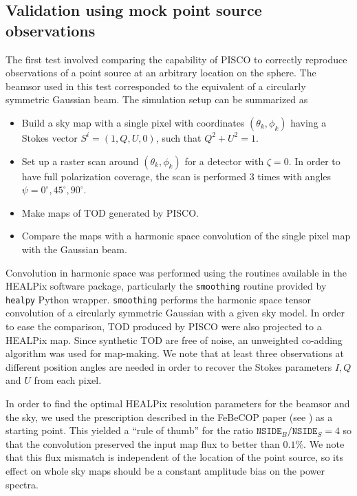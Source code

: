 \documentclass[a4paper,fleqn]{cas-dc}\sloppy
\begin{document}
\subsection{Validation using mock point source observations}

The first test involved comparing the capability of PISCO to correctly reproduce observations of a point source at an arbitrary location on the sphere. The beamsor used in this test corresponded to the equivalent of a circularly symmetric Gaussian beam. The simulation setup can be summarized as

\begin{itemize}
	\item Build a sky map with a single pixel with coordinates $(\theta_k,\phi_k)$ having a Stokes vector $S^{i} = (1,Q,U,0)$, such that $Q^2 + U^2 = 1$.
	\item Set up a raster scan around $(\theta_k,\phi_k)$ for a detector with $\zeta=0$. In order to have full polarization coverage, the scan is performed 3 times with angles $\psi = 0^{\circ},45^{\circ},90^{\circ}$.
	\item Make maps of TOD generated by PISCO.
	\item Compare the maps with a harmonic space convolution of the single pixel map with the Gaussian beam.
\end{itemize}

\noindent
Convolution in harmonic space was performed using the routines available in the HEALPix software package\cite{2005ApJ...622..759G}, particularly the \texttt{smoothing} routine provided by \texttt{healpy} Python wrapper. \texttt{smoothing} performs the harmonic space tensor convolution of a circularly symmetric Gaussian with a given sky model. In order to ease the comparison, TOD produced by PISCO were also projected to a HEALPix map. Since synthetic TOD are free of noise, an unweighted co-adding algorithm was used for map-making. We note that at least three observations at different position angles are needed in order to recover the Stokes parameters $I,Q$ and $U$ from each pixel.

In order to find the optimal HEALPix resolution parameters for the beamsor and the sky, we used the prescription described in the FeBeCOP paper (see \cite{2011ApJS..193....5M}) as a starting point. This yielded a ``rule of thumb'' for the ratio $\mathrm{\texttt{NSIDE}}_{B} / \mathrm{\texttt{NSIDE}}_{S} = 4$ so that the convolution preserved the input map flux to better than $0.1\%$. We note that this flux mismatch is independent of the location of the point source, so its effect on whole sky maps should be a constant amplitude bias on the power spectra.
\end{document}
